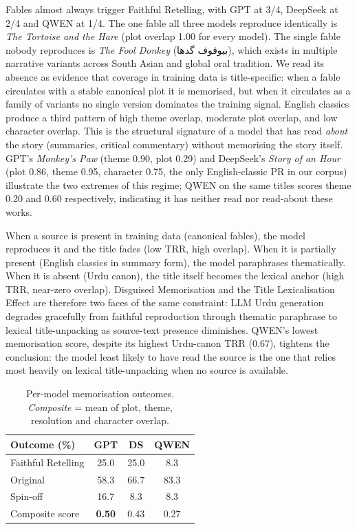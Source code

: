 \documentclass[11pt]{article}
\begin{document}
Fables almost always trigger Faithful Retelling, with GPT
at 3/4, DeepSeek at 2/4 and QWEN at 1/4. The one fable all
three models reproduce identically is \emph{The Tortoise
and the Hare} (plot overlap 1.00 for every model). The
single fable nobody reproduces is \emph{The Fool Donkey}
(\foreignlanguage{arabic}{بیوقوف گدھا}), which exists in
multiple narrative variants across South Asian and global
oral tradition. We read its absence as evidence that
coverage in training data is title-specific: when a fable
circulates with a stable canonical plot it is memorised,
but when it circulates as a family of variants no single
version dominates the training signal. English classics
produce a third pattern of high theme overlap, moderate
plot overlap, and low character overlap. This is the
structural signature of a model that has read \emph{about}
the story (summaries, critical commentary) without
memorising the story itself. GPT's \emph{Monkey's Paw}
(theme 0.90, plot 0.29) and DeepSeek's \emph{Story of an
Hour} (plot 0.86, theme 0.95, character 0.75, the only
English-classic PR in our corpus) illustrate the two
extremes of this regime; QWEN on the same titles scores
theme 0.20 and 0.60 respectively, indicating it has neither
read nor read-about these works.

When a source is present in training data (canonical
fables), the model reproduces it and the title
fades (low TRR, high overlap). When it is partially present
(English classics in summary form), the model paraphrases
thematically. When it is absent (Urdu canon),
the title itself becomes the lexical anchor (high TRR,
near-zero overlap). Disguised Memorisation and the Title
Lexicalisation Effect are therefore two faces of the same
constraint: LLM Urdu generation degrades gracefully from
faithful reproduction through thematic paraphrase to
lexical title-unpacking as source-text presence diminishes.
QWEN's lowest memorisation score, despite its highest
Urdu-canon TRR (0.67), tightens the conclusion: the model
least likely to have read the source is the one that
relies most heavily on lexical title-unpacking when no
source is available.

\begin{table}[ht]
\centering\small
\caption{Per-model memorisation outcomes. \emph{Composite} = mean of plot, theme, resolution
and character overlap.}
\label{tab:memorisation_results}
\begin{tabular}{lccc}
\hline
\textbf{Outcome (\%)} & \textbf{GPT} & \textbf{DS} & \textbf{QWEN} \\
\hline
Faithful Retelling     & 25.0 & 25.0 & \phantom{0}8.3 \\
Original               & 58.3 & 66.7 & 83.3 \\
Spin-off               & 16.7 & \phantom{0}8.3 & \phantom{0}8.3 \\
\hline
Composite score        & \textbf{0.50} & 0.43 & 0.27 \\
\hline
\end{tabular}
\end{table}
\end{document}
